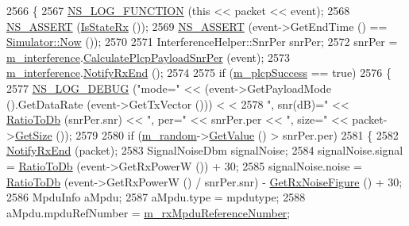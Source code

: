 \begin{DoxyCode}
2566 \{
2567   \hyperlink{log-macros-disabled_8h_a90b90d5bad1f39cb1b64923ea94c0761}{NS\_LOG\_FUNCTION} (\textcolor{keyword}{this} << packet << event);
2568   \hyperlink{assert_8h_a6dccdb0de9b252f60088ce281c49d052}{NS\_ASSERT} (\hyperlink{classns3_1_1WifiPhy_a754ce070e2635c324a0b818b56eb0a4c}{IsStateRx} ());
2569   \hyperlink{assert_8h_a6dccdb0de9b252f60088ce281c49d052}{NS\_ASSERT} (event->GetEndTime () == \hyperlink{classns3_1_1Simulator_ac3178fa975b419f7875e7105be122800}{Simulator::Now} ());
2570 
2571   InterferenceHelper::SnrPer snrPer;
2572   snrPer = \hyperlink{classns3_1_1WifiPhy_a55909109ad2e2759702336770fa90119}{m\_interference}.\hyperlink{classns3_1_1InterferenceHelper_adb068fe0e595bab495b68e1dad9aca12}{CalculatePlcpPayloadSnrPer} (event);
2573   \hyperlink{classns3_1_1WifiPhy_a55909109ad2e2759702336770fa90119}{m\_interference}.\hyperlink{classns3_1_1InterferenceHelper_a4b45bac60d8b7c412236794cf393945d}{NotifyRxEnd} ();
2574 
2575   \textcolor{keywordflow}{if} (\hyperlink{classns3_1_1WifiPhy_ad9a571bc52ef6cd8e63cff3dc14a718e}{m\_plcpSuccess} == \textcolor{keyword}{true})
2576     \{
2577       \hyperlink{group__logging_ga413f1886406d49f59a6a0a89b77b4d0a}{NS\_LOG\_DEBUG} (\textcolor{stringliteral}{"mode="} << (event->GetPayloadMode ().GetDataRate (event->GetTxVector ())) <
      <
2578                     \textcolor{stringliteral}{", snr(dB)="} << \hyperlink{namespacens3_a132cf27eedb5e15a1427faf8724be4d2}{RatioToDb} (snrPer.snr) << \textcolor{stringliteral}{", per="} << snrPer.per << \textcolor{stringliteral}{", size="} 
      << packet->\hyperlink{classns3_1_1Packet_a462855c9929954d4301a4edfe55f4f1c}{GetSize} ());
2579 
2580       \textcolor{keywordflow}{if} (\hyperlink{classns3_1_1WifiPhy_a0fd27ae928c74ebda56129b5b4248b90}{m\_random}->\hyperlink{classns3_1_1UniformRandomVariable_a03822d8c86ac51e9aa83bbc73041386b}{GetValue} () > snrPer.per)
2581         \{
2582           \hyperlink{classns3_1_1WifiPhy_a878717b5caea24312151a54461842ec9}{NotifyRxEnd} (packet);
2583           SignalNoiseDbm signalNoise;
2584           signalNoise.signal = \hyperlink{namespacens3_a132cf27eedb5e15a1427faf8724be4d2}{RatioToDb} (event->GetRxPowerW ()) + 30;
2585           signalNoise.noise = \hyperlink{namespacens3_a132cf27eedb5e15a1427faf8724be4d2}{RatioToDb} (event->GetRxPowerW () / snrPer.snr) - 
      \hyperlink{classns3_1_1WifiPhy_aa25fdece132cb7ac83f95b41196fd69b}{GetRxNoiseFigure} () + 30;
2586           MpduInfo aMpdu;
2587           aMpdu.type = mpdutype;
2588           aMpdu.mpduRefNumber = \hyperlink{classns3_1_1WifiPhy_ac4d2a0ac103e58c27743527d8289cc53}{m\_rxMpduReferenceNumber};

\end{DoxyCode}
